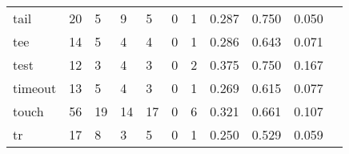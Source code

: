 \begin{longtable}{lp{1.2cm}p{1.2cm}p{1.2cm}p{1.2cm}p{1.2cm}p{1.2cm}p{1.2cm}p{1.2cm}p{1.2cm}p{1.2cm}}
tail      &                                    20 &                                                  5 &                                                  9 &                                                  5 &                                                  0 &                                                  1 &                                         0.287 &                                              0.750 &                                              0.050 \\
tee       &                                    14 &                                                  5 &                                                  4 &                                                  4 &                                                  0 &                                                  1 &                                         0.286 &                                              0.643 &                                              0.071 \\
test      &                                    12 &                                                  3 &                                                  4 &                                                  3 &                                                  0 &                                                  2 &                                         0.375 &                                              0.750 &                                              0.167 \\
timeout   &                                    13 &                                                  5 &                                                  4 &                                                  3 &                                                  0 &                                                  1 &                                         0.269 &                                              0.615 &                                              0.077 \\
touch     &                                    56 &                                                 19 &                                                 14 &                                                 17 &                                                  0 &                                                  6 &                                         0.321 &                                              0.661 &                                              0.107 \\
tr        &                                    17 &                                                  8 &                                                  3 &                                                  5 &                                                  0 &                                                  1 &                                         0.250 &                                              0.529 &                                              0.059 \\

\end{longtable}
